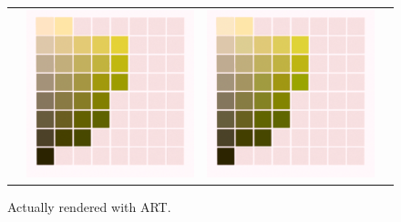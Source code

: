 \begin{figure}[t]
{\begin{tabular}{cccc}
			&
			\includegraphics[width=.30\linewidth]{img/results_art_page14_sigmoidFL11.png}
			&
			\includegraphics[width=.30\linewidth]{img/results_art_page14_ourFL11.png}
		\end{tabular}
	}
	\caption{Actually rendered with ART.}
	\label{fig:results_art_page14}
\end{figure}


